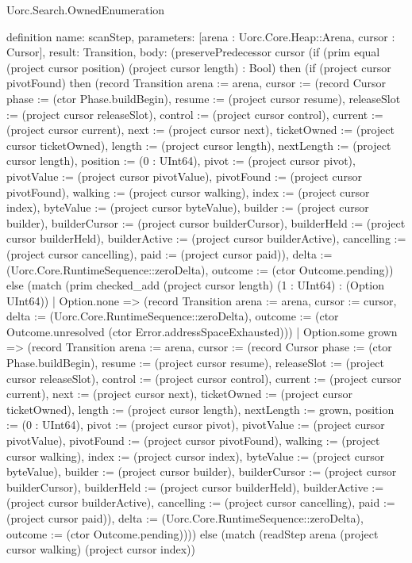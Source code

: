 \begin{lexlean}{Uorc.Search.OwnedEnumeration}
\begin{semanticmodule}
definition{
  name: scanStep,
  parameters: [arena : Uorc.Core.Heap::Arena, cursor : Cursor],
  result: Transition,
  body: (preservePredecessor cursor (if (prim equal (project cursor position) (project cursor length) : Bool) then (if (project cursor pivotFound) then (record Transition {arena := arena, cursor := (record Cursor {phase := (ctor Phase.buildBegin), resume := (project cursor resume), releaseSlot := (project cursor releaseSlot), control := (project cursor control), current := (project cursor current), next := (project cursor next), ticketOwned := (project cursor ticketOwned), length := (project cursor length), nextLength := (project cursor length), position := (0 : UInt64), pivot := (project cursor pivot), pivotValue := (project cursor pivotValue), pivotFound := (project cursor pivotFound), walking := (project cursor walking), index := (project cursor index), byteValue := (project cursor byteValue), builder := (project cursor builder), builderCursor := (project cursor builderCursor), builderHeld := (project cursor builderHeld), builderActive := (project cursor builderActive), cancelling := (project cursor cancelling), paid := (project cursor paid)}), delta := (Uorc.Core.RuntimeSequence::zeroDelta), outcome := (ctor Outcome.pending)}) else (match (prim checked_add (project cursor length) (1 : UInt64) : (Option UInt64))
    | Option.none => (record Transition {arena := arena, cursor := cursor, delta := (Uorc.Core.RuntimeSequence::zeroDelta), outcome := (ctor Outcome.unresolved (ctor Error.addressSpaceExhausted))})
    | Option.some grown => (record Transition {arena := arena, cursor := (record Cursor {phase := (ctor Phase.buildBegin), resume := (project cursor resume), releaseSlot := (project cursor releaseSlot), control := (project cursor control), current := (project cursor current), next := (project cursor next), ticketOwned := (project cursor ticketOwned), length := (project cursor length), nextLength := grown, position := (0 : UInt64), pivot := (project cursor pivot), pivotValue := (project cursor pivotValue), pivotFound := (project cursor pivotFound), walking := (project cursor walking), index := (project cursor index), byteValue := (project cursor byteValue), builder := (project cursor builder), builderCursor := (project cursor builderCursor), builderHeld := (project cursor builderHeld), builderActive := (project cursor builderActive), cancelling := (project cursor cancelling), paid := (project cursor paid)}), delta := (Uorc.Core.RuntimeSequence::zeroDelta), outcome := (ctor Outcome.pending)}))) else (match (readStep arena (project cursor walking) (project cursor index))
}
\end{semanticmodule}
\end{lexlean}
